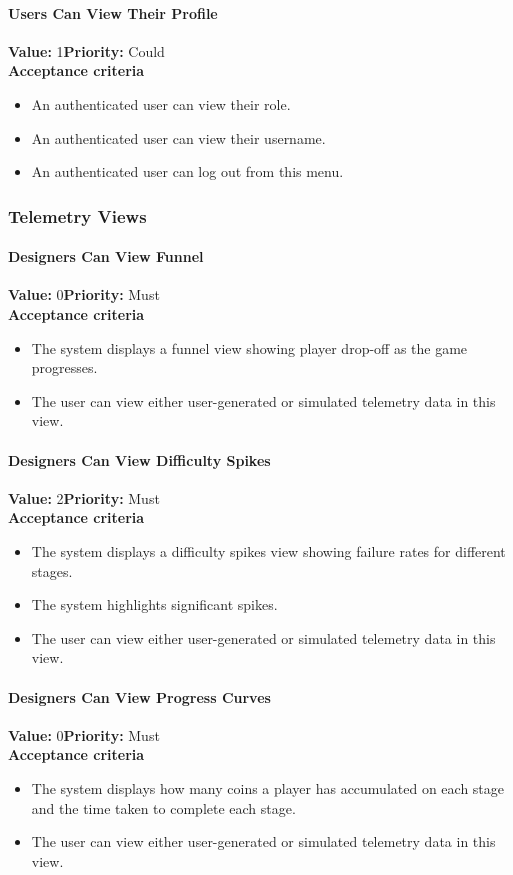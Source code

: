 \paragraph{Users Can View Their Profile}
\textbf{Value:} 1\quad \textbf{Priority:} Could\\
\textbf{Acceptance criteria}
\begin{itemize}
  \item An authenticated user can view their role.
  \item An authenticated user can view their username.
  \item An authenticated user can log out from this menu.
\end{itemize}

\subsubsection{Telemetry Views}

\paragraph{Designers Can View Funnel}
\textbf{Value:} 0\quad \textbf{Priority:} Must\\
\textbf{Acceptance criteria}
\begin{itemize}
  \item The system displays a funnel view showing player drop-off as the game progresses.
  \item The user can view either user-generated or simulated telemetry data in this view.
\end{itemize}

\paragraph{Designers Can View Difficulty Spikes}
\textbf{Value:} 2\quad \textbf{Priority:} Must\\
\textbf{Acceptance criteria}
\begin{itemize}
  \item The system displays a difficulty spikes view showing failure rates for different stages.
  \item The system highlights significant spikes. 
  \item The user can view either user-generated or simulated telemetry data in this view.
\end{itemize}

\paragraph{Designers Can View Progress Curves}
\textbf{Value:} 0\quad \textbf{Priority:} Must\\
\textbf{Acceptance criteria}
\begin{itemize}
  \item The system displays how many coins a player has accumulated on each stage and the time taken to complete each stage.
  \item The user can view either user-generated or simulated telemetry data in this view.
\end{itemize}

